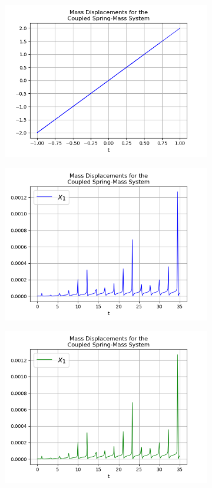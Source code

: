 \documentclass{article}
\begin{document}
\begin{figure}[h!]
\begin{subfigure}[b]{0.32\linewidth}
    \includegraphics[width=\linewidth]{two_springs213.png}
    \caption{}
  \end{subfigure}
  \begin{subfigure}[b]{0.45\linewidth}
    \includegraphics[width=\linewidth]{two_springs21e1.png}
    \caption{}
  \end{subfigure}
  \begin{subfigure}[b]{0.45\linewidth}
    \includegraphics[width=\linewidth]{two_springs21e2.png}

\end{subfigure}
\end{figure}
\end{document}
